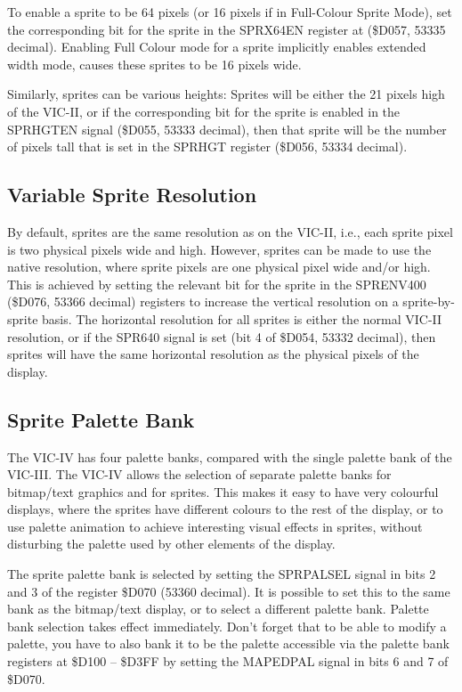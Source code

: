 To enable a sprite to be 64 pixels (or 16 pixels if in Full-Colour Sprite Mode), set the corresponding bit for the sprite in the SPRX64EN register at (\$D057, 53335 decimal).  Enabling Full Colour mode for a sprite implicitly enables extended width mode, causes these sprites to be 16 pixels wide.

Similarly, sprites can be various heights:  Sprites will be either the 21 pixels high of the VIC-II, or if the corresponding bit for the sprite is enabled in the SPRHGTEN signal (\$D055, 53333 decimal), then that sprite will be the number of pixels tall that is set in the SPRHGT
register (\$D056, 53334 decimal).

\subsection{Variable Sprite Resolution}

By default, sprites are the same resolution as on the VIC-II, i.e., each sprite pixel is two physical pixels wide and high.
However, sprites can be made to use the native resolution, where sprite pixels are one physical pixel wide and/or high.
This is achieved by setting the relevant bit for the sprite in the SPRENV400 (\$D076, 53366 decimal) registers to increase the
vertical resolution on a sprite-by-sprite basis.  The horizontal resolution for all sprites is either the normal VIC-II resolution, or if the SPR640 signal
is set (bit 4 of \$D054, 53332 decimal), then sprites will have the same horizontal resolution as the physical pixels of the display.

\subsection{Sprite Palette Bank}

The VIC-IV has four palette banks, compared with the single palette bank of the VIC-III.
The VIC-IV allows the selection of separate palette banks for bitmap/text graphics and for sprites.  This makes it easy to have
very colourful displays, where the sprites have different colours to the rest of the display, or to use palette animation to achieve
interesting visual effects in sprites, without disturbing the palette used by other elements of the display.

The sprite palette bank is selected by setting the SPRPALSEL signal in bits 2 and 3 of the register \$D070 (53360 decimal).
It is possible to set this to the same bank as the bitmap/text display, or to select a different palette bank.
Palette bank selection takes effect immediately.  Don't forget that to be able to modify a palette, you have to also bank it
to be the palette accessible via the palette bank registers at \$D100 -- \$D3FF by setting the MAPEDPAL signal in bits 6 and 7 of
\$D070.

